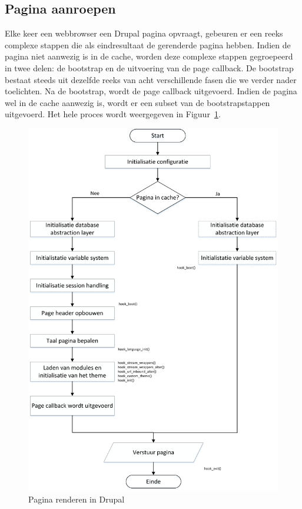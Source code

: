 \subsection{Pagina aanroepen}
Elke keer een webbrowser een Drupal pagina opvraagt, gebeuren er een reeks complexe stappen die als eindresultaat de gerenderde pagina hebben. Indien de pagina niet aanwezig is in de cache, worden deze complexe stappen gegroepeerd in twee delen: de bootstrap en de uitvoering van de page callback. De bootstrap bestaat steeds uit dezelfde reeks van acht verschillende fasen die we verder nader toelichten. Na de bootstrap, wordt de page callback uitgevoerd. Indien de pagina wel in de cache aanwezig is, wordt er een subset van de bootstrapstappen uitgevoerd. Het hele proces wordt weergegeven in Figuur~\ref{fig:drupalPageRendering}.

\begin{figure}
\includegraphics[width=1\textwidth]{fig/drupalPageRendering}
\caption{Pagina renderen in Drupal}
\label{fig:drupalPageRendering}
\end{figure}

